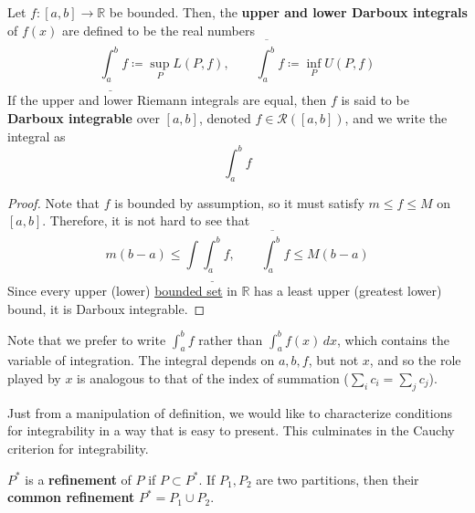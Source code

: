   \begin{definition}
    \label{def:riemann-integral}
    Let $f: [a, b] \to \mathbb{R}$ be bounded. Then, the \textbf{upper and lower Darboux integrals} of $f(x)$ are defined to be the real numbers
    \begin{equation}
      \underline{\int_a^b} f \coloneqq \sup_P L(P, f), \qquad \overline{\int_a^b} f \coloneqq \inf_P U(P, f)
    \end{equation}
    If the upper and lower Riemann integrals are equal, then $f$ is said to be \textbf{Darboux integrable} over $[a, b]$, denoted $f \in \mathcal{R}([a, b])$, and we write the integral as 
    \begin{equation}
      \int_a^b f
    \end{equation}
  \end{definition} 
  \begin{proof}
    Note that $f$ is bounded by assumption, so it must satisfy $m \leq f \leq M$ on $[a, b]$. Therefore, it is not hard to see that 
    \begin{equation}
      m (b - a) \leq \int \underline{\int_a^b} f, \qquad \overline{\int_a^b} f \leq M (b - a)
    \end{equation}
    Since every upper (lower) \hyperref[pst-def:bounded-set]{bounded set} in $\mathbb{R}$ has a least upper (greatest lower) bound, it is Darboux integrable. 
  \end{proof}

  Note that we prefer to write $\int_a^b f$ rather than $\int_a^b f(x) \,dx$, which contains the variable of integration. The integral depends on $a, b, f$, but not $x$, and so the role played by $x$ is analogous to that of the index of summation ($\sum_i c_i = \sum_j c_j$). 

  Just from a manipulation of definition, we would like to characterize conditions for integrability in a way that is easy to present. This culminates in the Cauchy criterion for integrability. 

  \begin{definition}[Refinement]
    \label{def:refinement}
    $P^\ast$ is a \textbf{refinement} of $P$ if $P \subset P^\ast$. If $P_1, P_2$ are two partitions, then their \textbf{common refinement} $P^\ast = P_1 \cup P_2$. 
  \end{definition}

